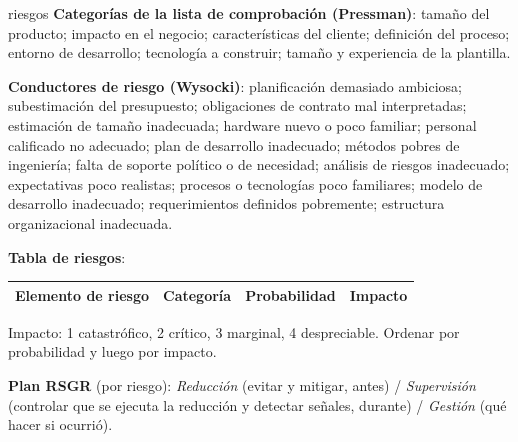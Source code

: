 \documentclass[11pt,a4paper]{article}
\begin{document}
\begin{plantilla}{riesgos}
\textbf{Categorías de la lista de comprobación (Pressman)}: tamaño del producto; impacto en el negocio;
características del cliente; definición del proceso; entorno de desarrollo; tecnología a construir; tamaño y
experiencia de la plantilla.

\textbf{Conductores de riesgo (Wysocki)}: planificación demasiado ambiciosa; subestimación del presupuesto;
obligaciones de contrato mal interpretadas; estimación de tamaño inadecuada; hardware nuevo o poco familiar;
personal calificado no adecuado; plan de desarrollo inadecuado; métodos pobres de ingeniería; falta de soporte
político o de necesidad; análisis de riesgos inadecuado; expectativas poco realistas; procesos o tecnologías
poco familiares; modelo de desarrollo inadecuado; requerimientos definidos pobremente; estructura organizacional
inadecuada.

\textbf{Tabla de riesgos}:\quad \begin{tabular}{|l|l|l|l|}\hline Elemento de riesgo & Categoría & Probabilidad & Impacto\\\hline\end{tabular}

Impacto: 1 catastrófico, 2 crítico, 3 marginal, 4 despreciable. Ordenar por probabilidad y luego por impacto.

\textbf{Plan RSGR} (por riesgo): \emph{Reducción} (evitar y mitigar, antes) / \emph{Supervisión} (controlar que
se ejecuta la reducción y detectar señales, durante) / \emph{Gestión} (qué hacer si ocurrió).
\end{plantilla}
\end{document}
